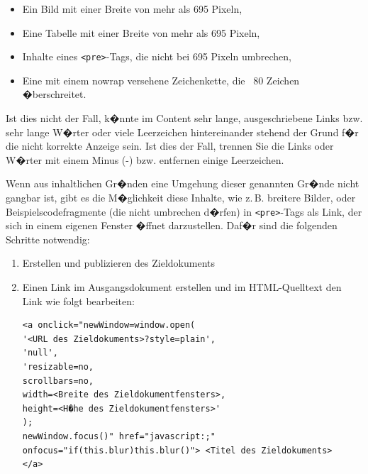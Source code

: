 \begin{itemize}
	\item {Ein Bild mit einer Breite von mehr als 695 Pixeln,}
	\item {Eine Tabelle mit einer Breite von mehr als 695 Pixeln,}
	\item {Inhalte eines \texttt{<pre>}-Tags, die nicht bei 695 Pixeln umbrechen,}
	\item {Eine mit einem nowrap versehene Zeichenkette, die ~80 Zeichen
�berschreitet.}
\end{itemize}

Ist dies nicht der Fall, k�nnte im Content sehr lange, ausgeschriebene Links bzw.
sehr lange W�rter oder viele Leerzeichen hintereinander stehend der Grund f�r die
nicht korrekte Anzeige sein. Ist dies der Fall, trennen Sie die Links oder W�rter mit
einem Minus (-) bzw. entfernen einige Leerzeichen.

Wenn aus inhaltlichen Gr�nden eine Umgehung dieser genannten Gr�nde nicht
gangbar ist, gibt es die M�glichkeit diese Inhalte, wie z.\,B. breitere Bilder, oder Beispielscodefragmente (die nicht umbrechen d�rfen) in \texttt{<pre>}-Tags als Link, der sich in
einem eigenen Fenster �ffnet darzustellen.
Daf�r sind die folgenden Schritte notwendig:

\begin{enumerate}
	\item {Erstellen und publizieren des Zieldokuments}
	\item {Einen Link im Ausgangsdokument erstellen und im HTML-Quelltext den Link
wie folgt bearbeiten:
\begin{verbatim}
<a onclick="newWindow=window.open(
'<URL des Zieldokuments>?style=plain',
'null',
'resizable=no,
scrollbars=no,
width=<Breite des Zieldokumentfensters>,
height=<H�he des Zieldokumentfensters>'
);
newWindow.focus()" href="javascript:;"
onfocus="if(this.blur)this.blur()"> <Titel des Zieldokuments>
</a>
\end{verbatim}
}
\end{enumerate}